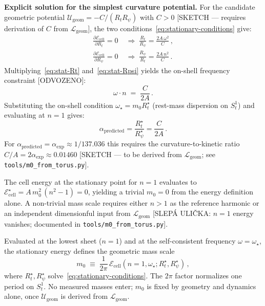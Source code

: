 \medskip
\noindent\textbf{Explicit solution for the simplest curvature potential.}
For the candidate geometric potential $\mathcal{U}_{\text{geom}}=-C/(R_t R_\psi)$ with $C>0$ [SKETCH — requires derivation of $C$ from $\mathcal{L}_\text{geom}$], the two conditions~\eqref{eq:stationary-conditions} give:
\begin{align}
  \frac{\partial\mathcal{E}_\text{cell}}{\partial R_t}=0 &\;\Rightarrow\;
    \frac{R_t}{R_\psi} = \frac{2A\,\omega^2}{C}\,, \label{eq:stat-Rt}\\
  \frac{\partial\mathcal{E}_\text{cell}}{\partial R_\psi}=0 &\;\Rightarrow\;
    \frac{R_\psi}{R_t} = \frac{2A\,n^2}{C}\,. \label{eq:stat-Rpsi}
\end{align}
Multiplying~\eqref{eq:stat-Rt} and~\eqref{eq:stat-Rpsi} yields the on-shell frequency constraint [ODVOZENO]:
\begin{equation}
  \omega\cdot n \;=\; \frac{C}{2A}\,.
\end{equation}
Substituting the on-shell condition $\omega_\star = m_0 R_t^\star$ (rest-mass dispersion on $S^1_t$) and evaluating at $n=1$ gives:
\begin{equation}
  \alpha_\text{predicted} = \frac{R_t^\star}{R_\psi^\star} = \frac{C}{2A}\,.
  \label{eq:alpha-from-geometry}
\end{equation}
For $\alpha_\text{predicted}=\alpha_\text{exp}\approx1/137.036$ this requires the curvature-to-kinetic ratio $C/A = 2\alpha_\text{exp}\approx0.01460$ [SKETCH — to be derived from $\mathcal{L}_\text{geom}$; see \texttt{tools/m0\_from\_torus.py}].

The cell energy at the stationary point for $n=1$ evaluates to $\mathcal{E}_\text{cell}^\star = A\,m_0^2\,(n^2-1)=0$, yielding a trivial $m_0=0$ from the energy definition alone. A non-trivial mass scale requires either $n>1$ as the reference harmonic or an independent dimensionful input from $\mathcal{L}_\text{geom}$ [SLEPÁ ULIČKA: $n=1$ energy vanishes; documented in \texttt{tools/m0\_from\_torus.py}].

Evaluated at the lowest sheet ($n=1$) and at the self-consistent frequency $\omega=\omega_\star$, the stationary energy defines the geometric mass scale
\begin{equation}
   m_0 \;\equiv\; \frac{1}{2\pi}\,\mathcal{E}_\text{cell}(n{=}1,\omega_\star;R_t^\star,R_\psi^\star)\,,
   \label{eq:m0-definition}
\end{equation}
where $R_t^\star,R_\psi^\star$ solve~\eqref{eq:stationary-conditions}. The $2\pi$ factor normalizes one period on $S^1_t$. No measured masses enter; $m_0$ is fixed by geometry and dynamics alone, once $\mathcal{U}_{\text{geom}}$ is derived from $\mathcal{L}_{\text{geom}}$.

